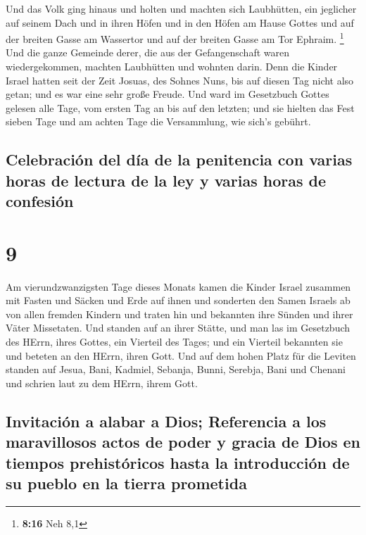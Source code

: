  Und das Volk ging hinaus und holten und machten sich
Laubhütten, ein jeglicher auf seinem Dach und in ihren Höfen und in den
Höfen am Hause Gottes und auf der breiten Gasse am Wassertor und auf der
breiten Gasse am Tor Ephraim. \footnote{\textbf{8:16} Neh 8,1}
 Und die ganze Gemeinde derer, die aus der Gefangenschaft
waren wiedergekommen, machten Laubhütten und wohnten darin. Denn die
Kinder Israel hatten seit der Zeit Josuas, des Sohnes Nuns, bis auf
diesen Tag nicht also getan; und es war eine sehr große Freude.
 Und ward im Gesetzbuch Gottes gelesen alle Tage, vom
ersten Tag an bis auf den letzten; und sie hielten das Fest sieben Tage
und am achten Tage die Versammlung, wie sich's gebührt.

\hypertarget{celebraciuxf3n-del-duxeda-de-la-penitencia-con-varias-horas-de-lectura-de-la-ley-y-varias-horas-de-confesiuxf3n}{%
\subsection{Celebración del día de la penitencia con varias horas de
lectura de la ley y varias horas de
confesión}\label{celebraciuxf3n-del-duxeda-de-la-penitencia-con-varias-horas-de-lectura-de-la-ley-y-varias-horas-de-confesiuxf3n}}

\hypertarget{section-8}{%
\section{9}\label{section-8}}

 Am vierundzwanzigsten Tage dieses Monats kamen die Kinder
Israel zusammen mit Fasten und Säcken und Erde auf ihnen 
und sonderten den Samen Israels ab von allen fremden Kindern und traten
hin und bekannten ihre Sünden und ihrer Väter Missetaten. 
Und standen auf an ihrer Stätte, und man las im Gesetzbuch des HErrn,
ihres Gottes, ein Vierteil des Tages; und ein Vierteil bekannten sie und
beteten an den HErrn, ihren Gott.  Und auf dem hohen Platz
für die Leviten standen auf Jesua, Bani, Kadmiel, Sebanja, Bunni,
Serebja, Bani und Chenani und schrien laut zu dem HErrn, ihrem Gott.

\hypertarget{invitaciuxf3n-a-alabar-a-dios-referencia-a-los-maravillosos-actos-de-poder-y-gracia-de-dios-en-tiempos-prehistuxf3ricos-hasta-la-introducciuxf3n-de-su-pueblo-en-la-tierra-prometida}{%
\subsection{Invitación a alabar a Dios; Referencia a los maravillosos
actos de poder y gracia de Dios en tiempos prehistóricos hasta la
introducción de su pueblo en la tierra
prometida}\label{invitaciuxf3n-a-alabar-a-dios-referencia-a-los-maravillosos-actos-de-poder-y-gracia-de-dios-en-tiempos-prehistuxf3ricos-hasta-la-introducciuxf3n-de-su-pueblo-en-la-tierra-prometida}}

